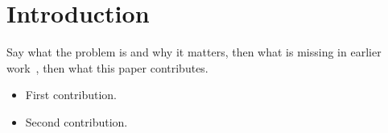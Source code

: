 \section{Introduction}
Say what the problem is and why it matters, then what is missing in earlier work~\citep{example2026}, then what this paper contributes.

\begin{itemize}
  \item First contribution.
  \item Second contribution.
\end{itemize}
